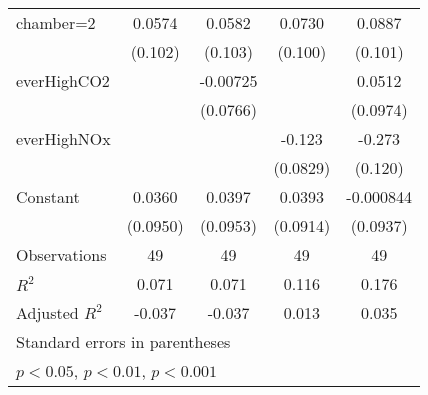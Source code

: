 {\begin{tabular}{l*{4}{c}}
\addlinespace
chamber=2           &      0.0574         &      0.0582         &      0.0730         &      0.0887         \\
                    &     (0.102)         &     (0.103)         &     (0.100)         &     (0.101)         \\
\addlinespace
everHighCO2         &                     &    -0.00725         &                     &      0.0512         \\
                    &                     &    (0.0766)         &                     &    (0.0974)         \\
\addlinespace
everHighNOx         &                     &                     &      -0.123         &      -0.273\sym{*}  \\
                    &                     &                     &    (0.0829)         &     (0.120)         \\
\addlinespace
Constant            &      0.0360         &      0.0397         &      0.0393         &   -0.000844         \\
                    &    (0.0950)         &    (0.0953)         &    (0.0914)         &    (0.0937)         \\
\midrule
Observations        &          49         &          49         &          49         &          49         \\
\(R^{2}\)           &       0.071         &       0.071         &       0.116         &       0.176         \\
Adjusted \(R^{2}\)  &      -0.037         &      -0.037         &       0.013         &       0.035         \\
\bottomrule
\multicolumn{5}{l}{\footnotesize Standard errors in parentheses}\\
\multicolumn{5}{l}{\footnotesize \sym{*} \(p<0.05\), \sym{**} \(p<0.01\), \sym{***} \(p<0.001\)}\\
\end{tabular}
}
